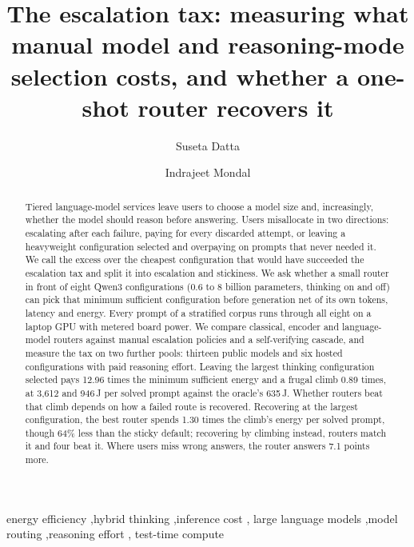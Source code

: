 \documentclass[final,5p,times,twocolumn]{elsarticle}
\theoremstyle{plain}
\begin{document}
\begin{frontmatter}

\title{The escalation tax: measuring what manual model and
reasoning-mode selection costs, and whether a one-shot router recovers it}

\author[a]{Suseta Datta}
\author[a]{Indrajeet Mondal}


\begin{abstract}
Tiered language-model services leave users to choose a model size and,
increasingly, whether the model should reason before answering. Users
misallocate in two directions: escalating after each failure, paying for
every discarded attempt, or leaving a heavyweight configuration selected and
overpaying on prompts that never needed it. We call the excess over the
cheapest configuration that would have succeeded the escalation tax and
split it into escalation and stickiness. We ask whether a small router in
front of eight Qwen3 configurations (0.6 to 8 billion parameters, thinking
on and off) can pick that minimum sufficient configuration before generation
net of its own tokens, latency and energy. Every prompt of a
stratified corpus runs through all eight on a laptop GPU with metered board
power. We compare classical, encoder and language-model routers against
manual escalation policies and a self-verifying cascade, and measure the tax
on two further pools: thirteen public models and six hosted configurations
with paid reasoning effort. Leaving the largest thinking configuration
selected pays 12.96 times the minimum sufficient energy and a frugal climb
0.89 times, at 3{,}612 and 946\,J per solved prompt against the oracle's
635\,J. Whether routers beat that climb depends on how a failed route is
recovered. Recovering at the largest configuration, the best router spends
1.30 times the climb's energy per solved prompt, though 64\% less than the
sticky default; recovering by climbing instead, routers match it and four
beat it. Where users miss wrong answers, the router answers 7.1 points more.
\end{abstract}

\begin{keyword}
energy efficiency \sep hybrid thinking \sep inference cost \sep
large language models \sep model routing \sep reasoning effort \sep
test-time compute
\end{keyword}

\end{frontmatter}











{\footnotesize
\setlength{\bibsep}{0pt plus 0.3ex}

}
\end{document}
